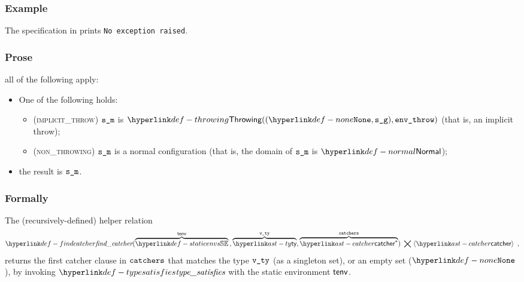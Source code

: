 \subsubsection{Example}
The specification in  prints \texttt{No exception raised}.

\subsubsection{Prose}
all of the following apply:
\begin{itemize}
  \item One of the following holds:
  \begin{itemize}
    \item (\textsc{implicit\_throw}) $\sm$ is $\Throwing((\None, \sg), \envthrow)$ (that is, an implicit throw);
    \item (\textsc{non\_throwing}) $\sm$ is a normal configuration (that is, the domain of $\sm$ is $\Normal$);
  \end{itemize}
  \item the result is $\sm$.
\end{itemize}

\subsubsection{Formally}
\begin{mathpar}
\end{mathpar}

\begin{mathpar}
\end{mathpar}

\hypertarget{def-findcatcher}{}
The (recursively-defined) helper relation
\[
  \findcatcher(\overname{\staticenvs}{\tenv} \aslsep \overname{\ty}{\vvty}, \overname{\catcher^*}{\catchers})
  \;\aslrel\; \langle \catcher \rangle \enspace,
\]
returns the first catcher clause in $\catchers$ that matches the type $\vvty$ (as a singleton set), or an empty set ($\None$),
by invoking $\typesat$ with the static environment $\tenv$.

